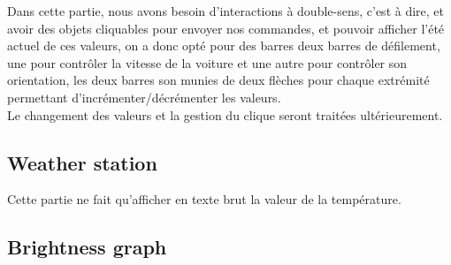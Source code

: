 Dans cette partie, nous avons besoin d'interactions à double-sens, c’est à dire, et avoir des objets cliquables pour envoyer nos commandes, et pouvoir afficher l’été actuel de ces valeurs, on a donc opté pour des barres deux barres de défilement, une pour contrôler la vitesse de la voiture et une autre pour contrôler son orientation, les deux barres son munies de deux flèches pour chaque extrémité permettant d’incrémenter/décrémenter les valeurs.\\
Le changement des valeurs et la gestion du clique seront traitées ultérieurement.

\subsection{Weather station}

Cette partie ne fait qu'afficher en texte brut la valeur de la température.

\subsection{Brightness graph}

